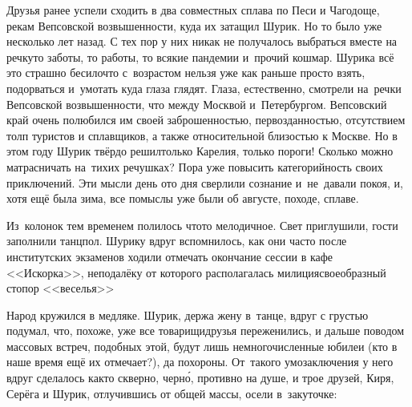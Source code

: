 {Друзья ранее успели сходить в два совместных сплава по Песи и Чагодоще, рекам Вепсовской возвышенности, куда их затащил Шурик. Но то было уже несколько лет назад. С тех пор у них никак не получалось выбраться вместе на речку\mdash то заботы, то работы, то всякие пандемии и~прочий кошмар. Шурика всё это страшно бесило\mdash что с~возрастом нельзя уже как раньше просто взять, подорваться и~умотать куда глаза глядят. Глаза, естественно, смотрели на~речки Вепсовской возвышенности, что между Москвой и~Петербургом. Вепсовский край очень полюбился им своей заброшенностью, первозданностью, отсутствием толп туристов и сплавщиков, а также относительной близостью к Москве. Но в этом году Шурик твёрдо решил\mdash только Карелия, только пороги! Сколько можно матрасничать на~тихих речушках? Пора уже повысить категорийность своих приключений. Эти мысли день ото дня сверлили сознание и~не~давали покоя, и, хотя ещё была зима, все помыслы уже были об августе, походе, сплаве.

%
%
%

Из~колонок тем временем полилось что\sdash то мелодичное. Свет приглушили, гости заполнили танцпол. Шурику вдруг вспомнилось, как они часто после институтских экзаменов ходили отмечать окончание сессии в кафе <<Искорка>>, неподалёку от которого располагалась милиция\mdash своеобразный стопор <<веселья>>\myldots{}

Народ кружился в медляке. Шурик, держа жену в~танце, вдруг с грустью подумал, что, похоже, уже все товарищи\sdash друзья переженились, и дальше поводом массовых встреч, подобных этой, будут лишь немногочисленные юбилеи (кто в наше время ещё их отмечает?), да похороны. От~такого умозаключения у него вдруг сделалось как\sdash то скверно, черн\'{о}, противно на душе, и трое друзей, Киря, Серёга и Шурик, отлучившись от общей массы, осели в~закуточке:

}
